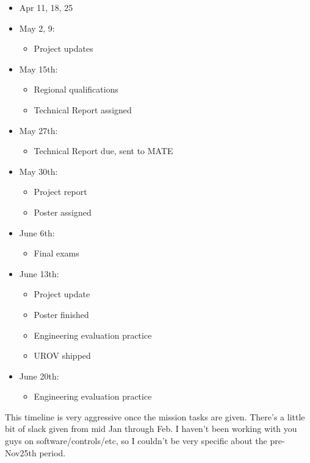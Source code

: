 \documentclass{proposalnsf}
\begin{document}
\begin{itemize}
\item Apr 11, 18, 25

\item May 2, 9:
    \begin{itemize} 
         \item Project updates
    \end{itemize}

\item May 15th:
    \begin{itemize} 
         \item Regional qualifications
         \item Technical Report assigned
    \end{itemize}

\item May 27th:
    \begin{itemize} 
         \item Technical Report due, sent to MATE
    \end{itemize}

\item May 30th:
    \begin{itemize} 
         \item Project report
         \item Poster assigned
    \end{itemize}

\item June 6th:
    \begin{itemize} 
        \item Final exams
    \end{itemize}

\item June 13th:
    \begin{itemize} 
         \item Project update
         \item Poster finished
         \item Engineering evaluation practice
         \item UROV shipped
    \end{itemize}

\item June 20th:
    \begin{itemize} 
        \item Engineering evaluation practice
    \end{itemize}
\end{itemize}


This timeline is very aggressive once the mission tasks are given.
There's a little bit of slack given from mid Jan through Feb. I
haven't been working with you guys on software/controls/etc, so I
couldn't be very specific about the pre-Nov25th period.
\end{document}
